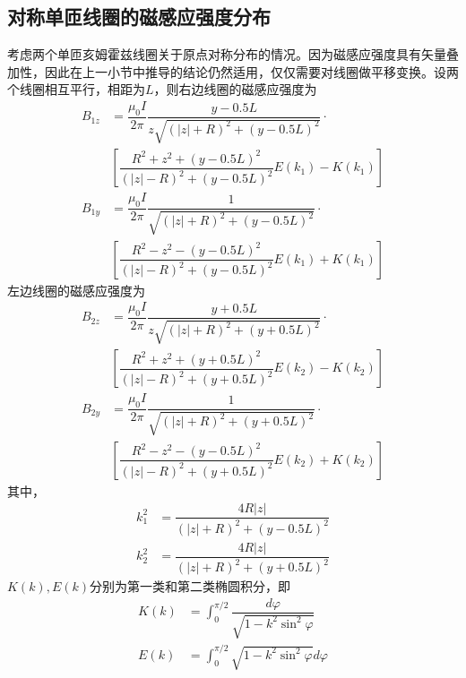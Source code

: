 \documentclass{ctexart}
\begin{document}
\begin{multicols}{2}
\subsection{对称单匝线圈的磁感应强度分布}
考虑两个单匝亥姆霍兹线圈关于原点对称分布的情况。因为磁感应强度具有矢量叠加性，因此在上一小节中推导的结论仍然适用，仅仅需要对线圈做平移变换。设两个线圈相互平行，相距为$L$，则右边线圈的磁感应强度为
\begin{align}
    B_{1z}&=\dfrac{\mu_0 I}{2\pi}\dfrac{y-0.5L}{z\sqrt{(|z|+R)^2+(y-0.5L)^2}} \cdot \\
    &[\dfrac{R^2+z^2+(y-0.5L)^2}{(|z|-R)^2+(y-0.5L)^2}E(k_1)-K(k_1)]\\
    B_{1y}&=\dfrac{\mu_0 I}{2\pi}\dfrac{1}{\sqrt{(|z|+R)^2+(y-0.5L)^2}}\cdot \\
    &[\dfrac{R^2-z^2-(y-0.5L)^2}{(|z|-R)^2+(y-0.5L)^2}E(k_1)+K(k_1)]
\end{align}
左边线圈的磁感应强度为
\begin{align}
    B_{2z}&=\dfrac{\mu_0 I}{2\pi}\dfrac{y+0.5L}{z\sqrt{(|z|+R)^2+(y+0.5L)^2}} \cdot \\
    &[\dfrac{R^2+z^2+(y+0.5L)^2}{(|z|-R)^2+(y+0.5L)^2}E(k_2)-K(k_2)]\\
    B_{2y}&=\dfrac{\mu_0 I}{2\pi}\dfrac{1}{\sqrt{(|z|+R)^2+(y+0.5L)^2}}\cdot \\
    &[\dfrac{R^2-z^2-(y-0.5L)^2}{(|z|-R)^2+(y+0.5L)^2}E(k_2)+K(k_2)]
\end{align}
其中，
\begin{align}
    k_1^2&=\dfrac{4R|z|}{(|z|+R)^2+(y-0.5L)^2}\\
    k_2^2&=\dfrac{4R|z|}{(|z|+R)^2+(y+0.5L)^2}
\end{align}
$K(k),E(k)$分别为第一类和第二类椭圆积分，即
\begin{align}
    K(k)&=\int_0^{\pi/2} \dfrac{d\varphi}{\sqrt{1-k^2 \sin ^2\varphi}}\\
    E(k)&=\int_0^{\pi/2} \sqrt{1-k^2 \sin ^2\varphi} d \varphi
\end{align}

\end{multicols}
\end{document}
